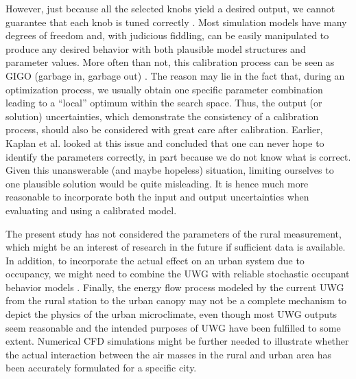 However, just because all the selected knobs yield a desired output, we cannot guarantee that each knob is tuned correctly \cite{reddy2007calibrating}. Most simulation models have many degrees of freedom and, with judicious fiddling, can be easily manipulated to produce any desired behavior with both plausible model structures and parameter values. More often than not, this calibration process can be seen as GIGO (garbage in, garbage out) \cite{saltelli2008global}. The reason may lie in the fact that, during an optimization process, we usually obtain one specific parameter combination leading to a ``local'' optimum within the search space. Thus, the output (or solution) uncertainties, which demonstrate the consistency of a calibration process, should also be considered with great care after calibration. Earlier, Kaplan et al. \cite{kaplan1990reconciliation} looked at this issue and concluded that one can never hope to identify the parameters correctly, in part because we do not know what is correct. Given this unanswerable (and maybe hopeless) situation, limiting ourselves to one plausible solution would be quite misleading. It is hence much more reasonable to incorporate both the input and output uncertainties when evaluating and using a calibrated model. 

The present study has not considered the parameters of the rural measurement, which might be an interest of research in the future if sufficient data is available. In addition, to incorporate the actual effect on an urban system due to occupancy, we might need to combine the UWG with reliable stochastic occupant behavior models \cite{hong2017ten}. Finally, the energy flow process modeled by the current UWG from the rural station to the urban canopy may not be a complete mechanism to depict the physics of the urban microclimate, even though most UWG outputs seem reasonable and the intended purposes of UWG have been fulfilled to some extent. Numerical CFD simulations might be further needed to illustrate whether the actual interaction between the air masses in the rural and urban area has been accurately formulated for a specific city.

\newpage
\mbox{}